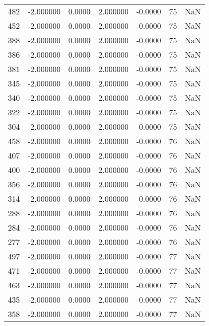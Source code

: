 \begin{tabular}{rrrrrrr}
482 &   -2.000000 &    0.0000 &    2.000000 &     -0.0000 &          75 & NaN \\
452 &   -2.000000 &    0.0000 &    2.000000 &     -0.0000 &          75 & NaN \\
388 &   -2.000000 &    0.0000 &    2.000000 &     -0.0000 &          75 & NaN \\
386 &   -2.000000 &    0.0000 &    2.000000 &     -0.0000 &          75 & NaN \\
381 &   -2.000000 &    0.0000 &    2.000000 &     -0.0000 &          75 & NaN \\
345 &   -2.000000 &    0.0000 &    2.000000 &     -0.0000 &          75 & NaN \\
340 &   -2.000000 &    0.0000 &    2.000000 &     -0.0000 &          75 & NaN \\
322 &   -2.000000 &    0.0000 &    2.000000 &     -0.0000 &          75 & NaN \\
304 &   -2.000000 &    0.0000 &    2.000000 &     -0.0000 &          75 & NaN \\
458 &   -2.000000 &    0.0000 &    2.000000 &     -0.0000 &          76 & NaN \\
407 &   -2.000000 &    0.0000 &    2.000000 &     -0.0000 &          76 & NaN \\
400 &   -2.000000 &    0.0000 &    2.000000 &     -0.0000 &          76 & NaN \\
356 &   -2.000000 &    0.0000 &    2.000000 &     -0.0000 &          76 & NaN \\
314 &   -2.000000 &    0.0000 &    2.000000 &     -0.0000 &          76 & NaN \\
288 &   -2.000000 &    0.0000 &    2.000000 &     -0.0000 &          76 & NaN \\
284 &   -2.000000 &    0.0000 &    2.000000 &     -0.0000 &          76 & NaN \\
277 &   -2.000000 &    0.0000 &    2.000000 &     -0.0000 &          76 & NaN \\
497 &   -2.000000 &    0.0000 &    2.000000 &     -0.0000 &          77 & NaN \\
471 &   -2.000000 &    0.0000 &    2.000000 &     -0.0000 &          77 & NaN \\
463 &   -2.000000 &    0.0000 &    2.000000 &     -0.0000 &          77 & NaN \\
435 &   -2.000000 &    0.0000 &    2.000000 &     -0.0000 &          77 & NaN \\
358 &   -2.000000 &    0.0000 &    2.000000 &     -0.0000 &          77 & NaN \\

\end{tabular}
